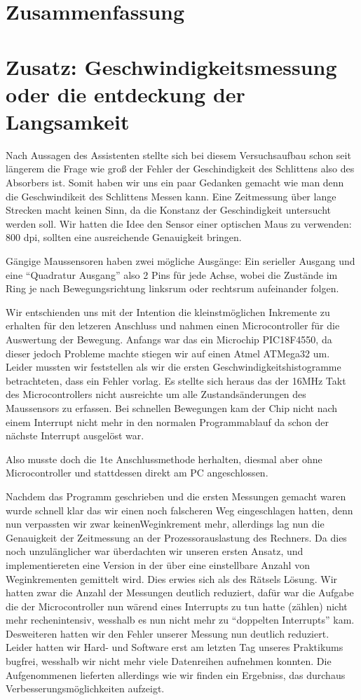 \documentclass[12pt]{article}
\begin{document}
\section{Zusammenfassung}

\section{Zusatz: Geschwindigkeitsmessung oder die entdeckung der Langsamkeit}
Nach Aussagen des Assistenten stellte sich bei diesem Versuchsaufbau schon seit längerem die Frage wie groß der Fehler der Geschindigkeit des Schlittens also des Absorbers ist. Somit haben wir uns ein paar Gedanken gemacht wie man denn die Geschwindikeit des Schlittens Messen kann. Eine Zeitmessung über lange Strecken macht keinen Sinn, da die Konstanz der Geschindigkeit untersucht werden soll. Wir hatten die Idee den Sensor einer optischen Maus zu verwenden: 800 dpi, sollten eine ausreichende Genauigkeit bringen.

Gängige Maussensoren haben zwei mögliche Ausgänge: Ein serieller Ausgang und eine ``Quadratur Ausgang'' also 2 Pins für jede Achse, wobei die Zustände im Ring je nach Bewegungsrichtung linksrum oder rechtsrum aufeinander folgen.

Wir entschienden uns mit der Intention die kleinstmöglichen Inkremente zu erhalten für den letzeren Anschluss und nahmen einen Microcontroller für die Auswertung der Bewegung. Anfangs war das ein Microchip PIC18F4550, da dieser jedoch Probleme machte stiegen wir auf einen Atmel ATMega32 um. Leider mussten wir feststellen als wir die ersten Geschwindigkeitshistogramme betrachteten, dass ein Fehler vorlag. Es stellte sich heraus das der 16MHz Takt des Microcontrollers nicht ausreichte um alle Zustandsänderungen des Maussensors zu erfassen. Bei schnellen Bewegungen kam der Chip nicht nach einem Interrupt nicht mehr in den normalen Programmablauf da schon der nächste Interrupt ausgelöst war.


Also musste doch die 1te Anschlussmethode herhalten, diesmal aber ohne Microcontroller und stattdessen direkt am PC angeschlossen.

Nachdem das Programm geschrieben und die ersten Messungen gemacht waren wurde schnell klar das wir einen noch falscheren Weg eingeschlagen hatten, denn nun verpassten wir zwar keinenWeginkrement mehr, allerdings 
lag nun die Genauigkeit der Zeitmessung an der Prozessorauslastung des Rechners. Da dies noch unzulänglicher war überdachten wir unseren ersten Ansatz, und implementiereten eine Version in der über eine einstellbare Anzahl von Weginkrementen gemittelt wird.
Dies erwies sich als des Rätsels Lösung. Wir hatten zwar die Anzahl der Messungen deutlich reduziert, dafür war die Aufgabe die der Microcontroller nun wärend eines Interrupts zu tun hatte (zählen) nicht mehr rechenintensiv, wesshalb es nun nicht mehr zu ``doppelten Interrupts'' kam.
Desweiteren hatten wir den Fehler unserer Messung nun deutlich reduziert. Leider hatten wir Hard- und Software erst am letzten Tag unseres Praktikums bugfrei, wesshalb wir nicht mehr viele Datenreihen aufnehmen konnten. Die Aufgenommenen lieferten allerdings wie wir finden ein 
Ergebniss, das durchaus Verbesserungsmöglichkeiten aufzeigt.
\end{document}
